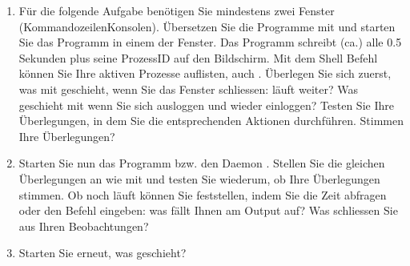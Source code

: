 \documentclass[a4paper,10pt,english]{report}
\begin{document}
\sphinxAtStartPar
{}
\begin{enumerate}
%
\item {} 
\sphinxAtStartPar
Für die folgende Aufgabe benötigen Sie mindestens zwei Fenster (Kommandozeilen\sphinxhyphen{}Konsolen). Übersetzen Sie die Programme mit  und starten Sie das Programm  in einem der Fenster. Das Programm schreibt (ca.) alle 0.5 Sekunden  plus seine Prozess\sphinxhyphen{}ID auf den Bildschirm. Mit dem Shell Befehl  können Sie Ihre aktiven Prozesse auflisten, auch . Überlegen Sie sich zuerst, was mit  geschieht, wenn Sie das Fenster schliessen: läuft  weiter? Was geschieht mit  wenn Sie sich ausloggen und wieder einloggen? Testen Sie Ihre Überlegungen, in dem Sie die entsprechenden Aktionen durchführen. Stimmen Ihre Überlegungen?

\begin{sphinxVerbatim}[commandchars=\\\{\}]

\end{sphinxVerbatim}

\item {} 
\sphinxAtStartPar
Starten Sie nun das Programm bzw. den Daemon . Stellen Sie die gleichen Überlegungen an wie mit  und testen Sie wiederum, ob Ihre Überlegungen stimmen. Ob  noch läuft können Sie feststellen, indem Sie die Zeit abfragen oder den Befehl  eingeben: was fällt Ihnen am Output auf? Was schliessen Sie aus Ihren Beobachtungen?

\begin{sphinxVerbatim}[commandchars=\\\{\}]

\end{sphinxVerbatim}

\item {} 
\sphinxAtStartPar
Starten Sie  erneut, was geschieht?

\begin{sphinxVerbatim}[commandchars=\\\{\}]


\end{sphinxVerbatim}
\end{enumerate}
\end{document}
